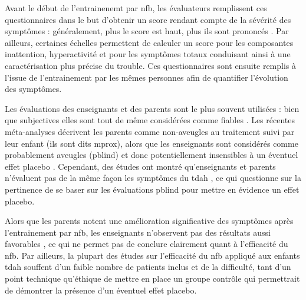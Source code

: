 Avant le début de l'entrainenemt par \gls{nfb}, les évaluateurs remplissent ces questionnaires dans le but d'obtenir un score rendant compte de 
la sévérité des symptômes : généralement, plus le score est haut, plus ils sont prononcés \citep{Pappas2006, Conners2008}. Par ailleurs, certaines échelles 
permettent de calculer un score pour les composantes inattention, hyperactivité et pour les symptômes totaux \citep{Pappas2006} conduisant ainsi à une caractérisation 
plus précise du trouble. Ces questionnaires sont ensuite remplis à l'issue de l'entrainement par les mêmes personnes afin de quantifier l'évolution 
des symptômes. 

Les évaluations des enseignants et des parents sont le plus souvent utilisées : bien que subjectives elles sont tout de même considérées comme fiables 
\citep{Mcgough2004}. Les récentes méta-analyses décrivent les parents comme non-aveugles au traitement suivi par leur enfant (ils sont dits \gls{mprox}), alors
que les enseignants sont considérés comme probablement aveugles (\gls{pblind}) et donc potentiellement insensibles à un éventuel effet placebo 
\citep{Micoulaud2014, Cortese2016}. Cependant, des études ont montré qu'enseignants et parents n'évaluent pas de la même façon les symptômes du \gls{tdah}
\citep{Sollie2013, Narad2015, Minder2018}, ce qui questionne sur la pertinence de se baser sur les évaluations \gls{pblind} pour mettre en évidence un 
effet placebo.

Alors que les parents notent une amélioration significative des symptômes après l'entrainement par \gls{nfb}, les enseignants n'observent pas des
résultats aussi favorables \citep{Arns2009, Sonuga-Barke2013, Cortese2016}, ce qui ne permet pas de conclure clairement quant à l'efficacité du \gls{nfb}.
Par ailleurs, la plupart des études sur l'efficacité du \gls{nfb} appliqué aux enfants \gls{tdah} souffent d'un faible nombre de patients inclus 
\citep{Baumeister2016, Heinrich2004} et de la difficulté, tant d'un point technique qu'éthique \citep{LaVaque2001, Birbaumer1991, Holtmann2014} de mettre en place 
un groupe contrôle qui permettrait de démontrer la présence d'un éventuel effet placebo.

